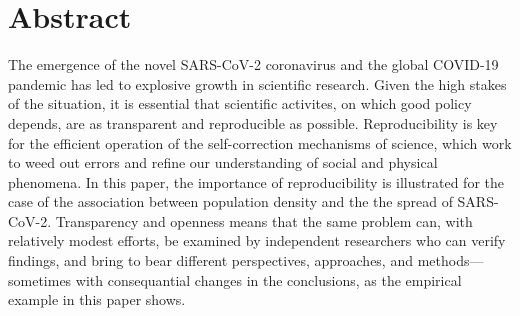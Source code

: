 \documentclass[10pt,letterpaper]{article}
\newcommand{\getIndex}[2]{
  \ForEach{,}{\IfEq{#1}{\thislevelitem}{\number\thislevelcount\ExitForEach}{}}{#2}
}
\newcommand{\getAff}[1]{
  \getIndex{#1}{McMaster University}
}
\begin{document}
\vspace*{0.2in}

\section*{Abstract}
The emergence of the novel SARS-CoV-2 coronavirus and the global
COVID-19 pandemic has led to explosive growth in scientific research.
Given the high stakes of the situation, it is essential that scientific
activites, on which good policy depends, are as transparent and
reproducible as possible. Reproducibility is key for the efficient
operation of the self-correction mechanisms of science, which work to
weed out errors and refine our understanding of social and physical
phenomena. In this paper, the importance of reproducibility is
illustrated for the case of the association between population density
and the the spread of SARS-CoV-2. Transparency and openness means that
the same problem can, with relatively modest efforts, be examined by
independent researchers who can verify findings, and bring to bear
different perspectives, approaches, and methods---sometimes with
consequantial changes in the conclusions, as the empirical example in
this paper shows.

\end{document}
